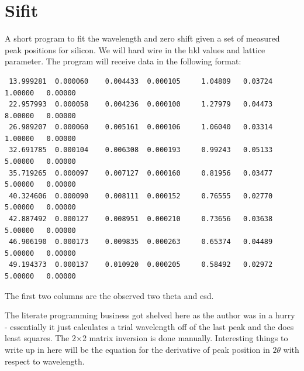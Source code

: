 \documentclass[10pt,a4paper,notitlepage]{article}
\begin{document}
\section{Sifit}
A short program to fit the wavelength and zero shift given a set of 
measured peak positions for silicon. We will hard wire in the hkl 
values and lattice parameter. The program will receive data in the 
following format:

\begin{verbatim}
 13.999281  0.000060    0.004433  0.000105     1.04809   0.03724     1.00000   0.00000
 22.957993  0.000058    0.004236  0.000100     1.27979   0.04473     8.00000   0.00000
 26.989207  0.000060    0.005161  0.000106     1.06040   0.03314     1.00000   0.00000
 32.691785  0.000104    0.006308  0.000193     0.99243   0.05133     5.00000   0.00000
 35.719265  0.000097    0.007127  0.000160     0.81956   0.03477     5.00000   0.00000
 40.324606  0.000090    0.008111  0.000152     0.76555   0.02770     5.00000   0.00000
 42.887492  0.000127    0.008951  0.000210     0.73656   0.03638     5.00000   0.00000
 46.906190  0.000173    0.009835  0.000263     0.65374   0.04489     5.00000   0.00000
 49.194373  0.000137    0.010920  0.000205     0.58492   0.02972     5.00000   0.00000
\end{verbatim}

The first two columns are the observed two theta and esd.

The literate programming business got shelved here as the author was in a 
hurry - essentially it just calculates a trial wavelength off of the last peak
and the does least squares. The 2$\times$2 matrix inversion is done manually.
Interesting things to write up in here will be the equation for the
derivative of peak position
in $2\theta$ with respect to wavelength.
\end{document}
